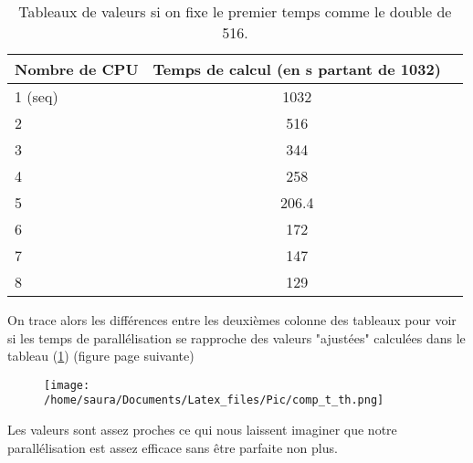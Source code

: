 \documentclass[french]{article}
\begin{document}
 \begin{table}[ht!]  
 \centering
 \begin{tabular}{|l|c|r|}
 
  \hline
  Nombre de CPU & Temps de calcul (en s partant de 1032)\\
  \hline
  1 (seq) & 1032\\
  2 & 516 \\
  3 & 344 \\
  4 & 258 \\
  5 & 206.4 \\
  6 & 172 \\
  7 & 147 \\
  8 & 129 \\
  \hline
\end{tabular}
\caption{Tableaux de valeurs si on fixe le premier temps comme le double de 516.}
\label{tabtab2}
\end{table}
On trace alors les différences entre les deuxièmes colonne des tableaux pour voir si les temps de parallélisation se rapproche des valeurs "ajustées" calculées dans le tableau (\ref{tabtab2}) (figure page suivante)

\pagebreak

\begin{figure}[ht!]
\centering
\texttt{[image: /home/saura/Documents/Latex\_files/Pic/comp\_t\_th.png]}
\end{figure}
Les valeurs sont assez proches ce qui nous laissent imaginer que notre parallélisation est assez efficace sans être parfaite non plus.\\
\end{document}

